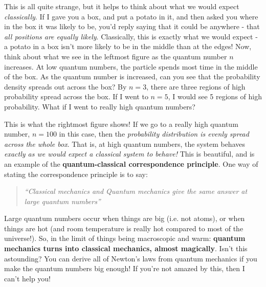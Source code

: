 \documentclass{memoir}[11pt,oneside,a4paper,openany]
\begin{document}
This is all quite strange, but it helps to think about what we would expect \emph{classically}. If I gave you a box, and put a potato in it, and then asked you where in the box it was likely to be, you'd reply saying that it could be anywhere - that \emph{all positions are equally likely}. Classically, this is exactly what we would expect - a potato in a box isn't more likely to be in the middle than at the edges! Now, think about what we see in the leftmost figure as the quantum number $n$ increases. At low quantum numbers, the particle spends most time in the middle of the box. As the quantum number is increased, can you see that the probability density spreads out across the box? By $n=3$, there are three regions of high probability spread across the box. If I went to $n=5$, I would see 5 regions of high probability. What if I went to really high quantum numbers?

This is what the rightmost figure shows! If we go to a really high quantum number, $n=100$ in this case, then the \emph{probability distribution is evenly spread across the whole box}. That is, at high quantum numbers, the system behaves \emph{exactly as we would expect a classical system to behave!} This is beautiful, and is an example of the \textbf{quantum-classical correspondence principle}. One way of stating the correspondence principle is to say:
\begin{quote}
	\textit{``Classical mechanics and Quantum mechanics give the same answer at large quantum numbers''}
\end{quote}
Large quantum numbers occur when things are big (i.e. not atoms), or when things are hot (and room temperature is really hot compared to most of the universe!). So, in the limit of things being macroscopic and warm: \textbf{quantum mechanics turns into classical mechanics, almost magically}. Isn't this astounding? You can derive all of Newton's laws from quantum mechanics if you make the quantum numbers big enough! If you're not amazed by this, then I can't help you!
\end{document}
